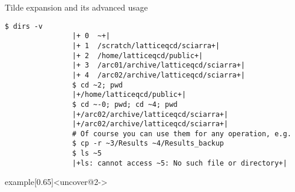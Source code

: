 \begin{frame}[fragile]{Tilde expansion and its advanced usage}
\begin{overlayarea}{\textwidth}{0.65\textheight}
\begin{onlyenv}
            \begin{lstlisting}[style=MyBash]
                $ dirs -v
                |+ 0  ~+|
                |+ 1  /scratch/latticeqcd/sciarra+|
                |+ 2  /home/latticeqcd/public+|
                |+ 3  /arc01/archive/latticeqcd/sciarra+|
                |+ 4  /arc02/archive/latticeqcd/sciarra+|
                $ cd ~2; pwd
                |+/home/latticeqcd/public+|
                $ cd ~-0; pwd; cd ~4; pwd
                |+/arc02/archive/latticeqcd/sciarra+|
                |+/arc02/archive/latticeqcd/sciarra+|
                # Of course you can use them for any operation, e.g.
                $ cp -r ~3/Results ~4/Results_backup
                $ ls ~5
                |+ls: cannot access ~5: No such file or directory+|
            \end{lstlisting}
        \end{onlyenv}
    \end{overlayarea}
    \begin{varblock}{example}[0.65\textwidth]{}<uncover@2->
        \large{}
    \end{varblock}
\end{frame}
